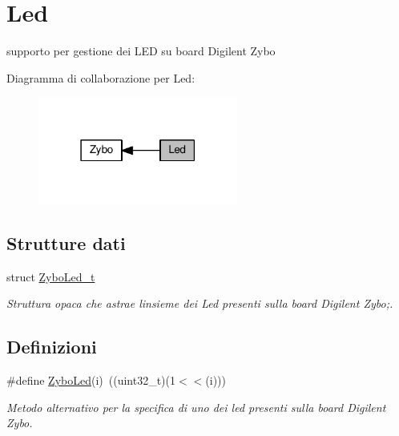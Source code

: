 \hypertarget{group___led}{}\section{Led}
\label{group___led}


supporto per gestione dei L\+ED su board Digilent Zybo  


Diagramma di collaborazione per Led\+:\nopagebreak
\begin{figure}[H]
\begin{center}
\leavevmode
\includegraphics[width=186pt]{group___led}
\end{center}
\end{figure}
\subsection*{Strutture dati}
\begin{DoxyCompactItemize}
\item 
struct \hyperlink{struct_zybo_led__t}{Zybo\+Led\+\_\+t}
\begin{DoxyCompactList}\small\item\em Struttura opaca che astrae l\textquotesingle{}insieme dei Led presenti sulla board Digilent Zybo;. \end{DoxyCompactList}\end{DoxyCompactItemize}
\subsection*{Definizioni}
\begin{DoxyCompactItemize}
\item 
\#define \hyperlink{group___led_ga50ab39fed34dc3aaf53cdfd67d8ba25d}{Zybo\+Led}(i)~((uint32\+\_\+t)(1$<$$<$(i)))
\begin{DoxyCompactList}\small\item\em Metodo alternativo per la specifica di uno dei led presenti sulla board Digilent Zybo. \end{DoxyCompactList}\end{DoxyCompactItemize}
